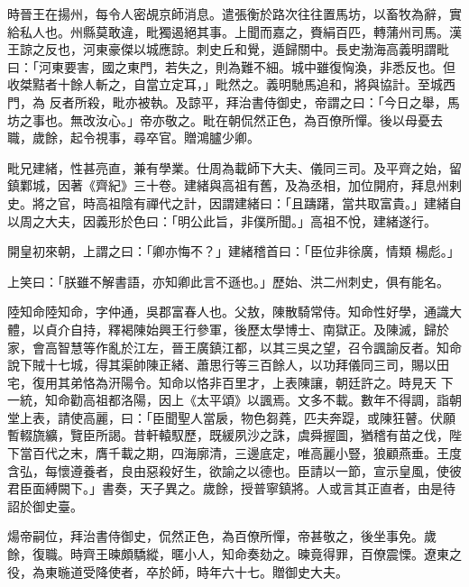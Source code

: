 \begin{pinyinscope}
 時晉王在揚州，每令人密覘京師消息。遣張衡於路次往往置馬坊，以畜牧為辭，實給私人也。州縣莫敢違，毗獨遏絕其事。上聞而嘉之，賚絹百匹，轉蒲州司馬。漢王諒之反也，河東豪傑以城應諒。刺史丘和覺，遁歸關中。長史渤海高義明謂毗曰：「河東要害，國之東門，若失之，則為難不細。城中雖復恟渙，非悉反也。但收桀黠者十餘人斬之，自當立定耳，」毗然之。義明馳馬追和，將與協計。至城西門，為
 反者所殺，毗亦被執。及諒平，拜治書侍御史，帝謂之曰：「今日之舉，馬坊之事也。無改汝心。」帝亦敬之。毗在朝侃然正色，為百僚所憚。後以母憂去職，歲餘，起令視事，尋卒官。贈鴻臚少卿。



 毗兄建緒，性甚亮直，兼有學業。仕周為載師下大夫、儀同三司。及平齊之始，留鎮鄴城，因著《齊紀》三十卷。建緒與高祖有舊，及為丞相，加位開府，拜息州剌史。將之官，時高祖陰有禪代之計，因謂建緒曰：「且躊躇，當共取富貴。」建緒自以周之大夫，因義形於色曰：「明公此旨，非僕所聞。」高祖不悅，建緒遂行。



 開皇初來朝，上謂之曰：「卿亦悔不？」建緒稽首曰：「臣位非徐廣，情類
 楊彪。」



 上笑曰：「朕雖不解書語，亦知卿此言不遜也。」歷始、洪二州刺史，俱有能名。



 陸知命陸知命，字仲通，吳郡富春人也。父敖，陳散騎常侍。知命性好學，通識大體，以貞介自持，釋褐陳始興王行參軍，後歷太學博士、南獄正。及陳滅，歸於家，會高智慧等作亂於江左，晉王廣鎮江都，以其三吳之望，召令諷諭反者。知命說下賊十七城，得其渠帥陳正緒、蕭思行等三百餘人，以功拜儀同三司，賜以田宅，復用其弟恪為汧陽令。知命以恪非百里才，上表陳讓，朝廷許之。時見天
 下一統，知命勸高祖都洛陽，因上《太平頌》以諷焉。文多不載。數年不得調，詣朝堂上表，請使高麗，曰：「臣聞聖人當扆，物色芻蕘，匹夫奔踶，或陳狂瞽。伏願暫輟旒纊，覽臣所謁。昔軒轅馭歷，既緩夙沙之誅，虞舜握圖，猶稽有苗之伐，陛下當百代之末，膺千載之期，四海廓清，三邊底定，唯高麗小豎，狼顧燕垂。王度含弘，每懷遵養者，良由惡殺好生，欲諭之以德也。臣請以一節，宣示皇風，使彼君臣面縛闕下。」書奏，天子異之。歲餘，授普寧鎮將。人或言其正直者，由是待詔於御史臺。



 煬帝嗣位，拜治書侍御史，侃然正色，為百僚所憚，帝甚敬之，後坐事免。歲
 餘，復職。時齊王暕頗驕縱，暱小人，知命奏劾之。暕竟得罪，百僚震慄。遼東之役，為東暆道受降使者，卒於師，時年六十七。贈御史大夫。




\end{pinyinscope}
